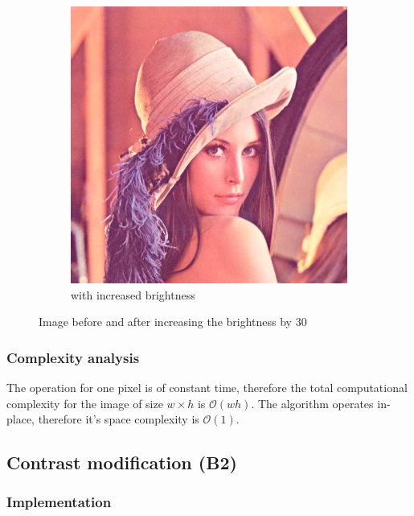 \documentclass[12pt]{article}
\theoremstyle{definition}
\newcommand{\subfiguresize}{.3\textwidth}
\begin{document}
\begin{figure}[H]
\begin{subfigure}[t]{\subfiguresize}
        \includegraphics[width=\textwidth]{lenac_bright+30.png}
        \caption{with increased brightness}
    \end{subfigure}
    \caption{Image before and after increasing the brightness by 30}
\end{figure}

\subsubsection{Complexity analysis}

The operation for one pixel is of constant time,
therefore the total computational complexity for the image of size $w \times h$ is $\mathcal{O}(wh)$.
The algorithm operates in-place, therefore it's space complexity is $\mathcal{O}(1)$.

\vspace{5em}
\pagebreak[3]
\subsection{Contrast modification (B2)}

\subsubsection{Implementation}
\end{document}
